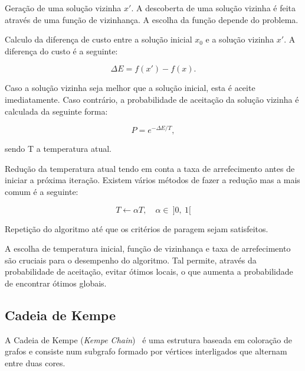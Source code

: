 \begin{compactitem}
    \item Geração de uma solução vizinha $x'$. A descoberta de uma solução vizinha é feita através de uma função de vizinhança. A escolha da função depende do problema.

    \item Calculo da diferença de custo entre a solução inicial $x_0$ e a solução vizinha $x'$. A diferença do custo é a seguinte:

    \begin{equation}
        \Delta E = f(x') - f(x).
    \end{equation}

    Caso a solução vizinha seja melhor que a solução inicial, esta é aceite imediatamente. Caso contrário, a probabilidade de aceitação da solução vizinha é calculada da seguinte forma:

    \begin{equation}
        P = e^{-\Delta E/T},
    \end{equation}

    sendo T a temperatura atual.

    \item Redução da temperatura atual tendo em conta a taxa de arrefecimento antes de iniciar a próxima iteração. Existem vários métodos de fazer a redução mas a mais comum é a seguinte:

    \begin{equation}
        T \leftarrow \alpha T, \quad \alpha \in \ \rbrack 0, \ 1 \lbrack
    \end{equation}

    \item Repetição do algoritmo até que os critérios de paragem sejam satisfeitos.
\end{compactitem}

A escolha de temperatura inicial, função de vizinhança e taxa de arrefecimento são cruciais para o desempenho do algoritmo. Tal permite, através da probabilidade de aceitação, evitar ótimos locais, o que aumenta a probabilidade de encontrar ótimos globais.

\subsection{Cadeia de Kempe}
\label{explic:kempe-chain}

A Cadeia de Kempe (\textit{Kempe Chain})~\cite{GuideGraphColouring-Lewis-2016} é uma estrutura baseada em coloração de grafos e consiste num subgrafo formado por vértices interligados que alternam entre duas cores.

